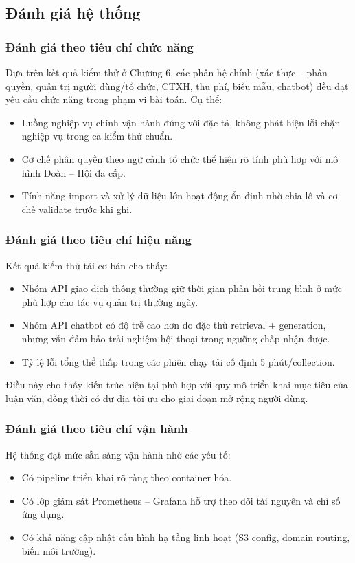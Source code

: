 \subsection{Đánh giá hệ thống}

\subsubsection{Đánh giá theo tiêu chí chức năng}
Dựa trên kết quả kiểm thử ở Chương 6, các phân hệ chính (xác thực -- phân quyền, quản trị người dùng/tổ chức, CTXH, thu phí, biểu mẫu, chatbot) đều đạt yêu cầu chức năng trong phạm vi bài toán. Cụ thể:
\begin{itemize}
	\item Luồng nghiệp vụ chính vận hành đúng với đặc tả, không phát hiện lỗi chặn nghiệp vụ trong ca kiểm thử chuẩn.
	\item Cơ chế phân quyền theo ngữ cảnh tổ chức thể hiện rõ tính phù hợp với mô hình Đoàn -- Hội đa cấp.
	\item Tính năng import và xử lý dữ liệu lớn hoạt động ổn định nhờ chia lô và cơ chế validate trước khi ghi.
\end{itemize}

\subsubsection{Đánh giá theo tiêu chí hiệu năng}
Kết quả kiểm thử tải cơ bản cho thấy:
\begin{itemize}
	\item Nhóm API giao dịch thông thường giữ thời gian phản hồi trung bình ở mức phù hợp cho tác vụ quản trị thường ngày.
	\item Nhóm API chatbot có độ trễ cao hơn do đặc thù retrieval + generation, nhưng vẫn đảm bảo trải nghiệm hội thoại trong ngưỡng chấp nhận được.
	\item Tỷ lệ lỗi tổng thể thấp trong các phiên chạy tải cố định 5 phút/collection.
\end{itemize}

Điều này cho thấy kiến trúc hiện tại phù hợp với quy mô triển khai mục tiêu của luận văn, đồng thời có dư địa tối ưu cho giai đoạn mở rộng người dùng.

\subsubsection{Đánh giá theo tiêu chí vận hành}
Hệ thống đạt mức sẵn sàng vận hành nhờ các yếu tố:
\begin{itemize}
	\item Có pipeline triển khai rõ ràng theo container hóa.
	\item Có lớp giám sát Prometheus -- Grafana hỗ trợ theo dõi tài nguyên và chỉ số ứng dụng.
	\item Có khả năng cập nhật cấu hình hạ tầng linh hoạt (S3 config, domain routing, biến môi trường).
\end{itemize}

